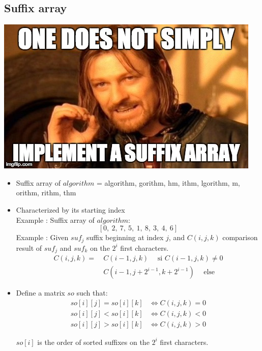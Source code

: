 \subsection{Suffix array}
\includegraphics[width=\linewidth]{suffixarray.jpg}
\begin{itemize}
\item Suffix array of $algorithm$ = algorithm, gorithm, hm, ithm, lgorithm, m, orithm, rithm, thm

\item Characterized by its starting index\\
Example : Suffix array of $algorithm$: $$[0, \ 2, \ 7, \ 5, \ 1, \ 8, \ 3, \ 4, \ 6]$$
Example : Given $suf_j$ suffix beginning at index $j$, and $C(i, j, k)$ comparison result of $suf_j$ and $suf_k$ on the $2^i$ first characters.
\begin{align*}
C(i, j, k) = & \ C(i - 1, j, k) \hspace{15pt} \text{si $C(i - 1, j, k) \neq 0$} \\
             & \ C(i - 1, j + 2^{i - 1}, k + 2^{i - 1}) \hspace{15pt} \text{else}
\end{align*}

\end{itemize}
\begin{itemize}

\item Define a matrix $so$ such that:
\begin{align*}
so[i][j] = so[i][k] & \Leftrightarrow C(i, j, k) = 0 \\
so[i][j] < so[i][k] & \Leftrightarrow C(i, j, k) < 0 \\
so[i][j] > so[i][k] & \Leftrightarrow C(i, j, k) > 0 
\end{align*}

$so[i]$ is the order of sorted suffixes on the $2^i$ first characters.

\end{itemize}

